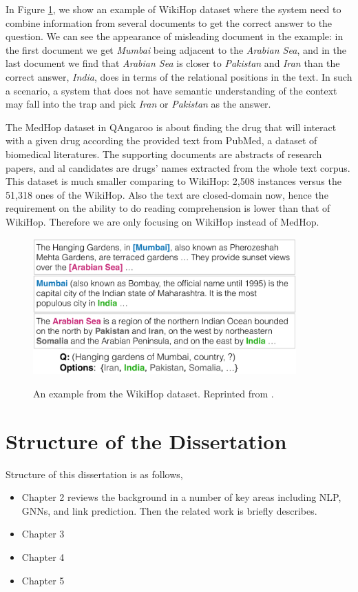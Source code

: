 \documentclass[12pt]{report}
\begin{document}
In Figure
\ref{wikihop_example}, we show an example of WikiHop dataset where the system need to combine information
from several documents to get the correct answer to the question. We can see the appearance of misleading
document in the example: in the first document we get \textit{Mumbai} being adjacent to the \textit{Arabian
Sea}, and in the last document we find that \textit{Arabian Sea} is closer to \textit{Pakistan} and \textit{Iran}
than the correct answer, \textit{India}, does in terms of the relational positions in the text. In such
a scenario, a system that does not have semantic understanding of the context may fall into the trap
and pick \textit{Iran} or \textit{Pakistan} as the answer.

The MedHop dataset in QAngaroo is about finding
the drug that will interact with a given drug according the provided text from PubMed, a dataset of biomedical
literatures. The supporting documents are abstracts of research papers, and al candidates are drugs'
names extracted from the whole text corpus. This dataset is much smaller comparing to WikiHop: 2,508
instances versus the 51,318 ones of the WikiHop. Also the text are closed-domain now, hence the requirement
on the ability to do reading comprehension is lower than that of WikiHop.
Therefore we are only focusing on WikiHop instead of MedHop.
\begin{figure}[H]
\centering
\includegraphics[width=0.9\textwidth]{figures/wikihop_example.png}
\label{wikihop_example}
\caption[An example from the WikiHop dataset]{An example from the WikiHop dataset. Reprinted from \cite{welbl_constructing_2018}.}
\end{figure}

\section{Structure of the Dissertation}
Structure of this dissertation is as follows,
\begin{itemize}
\item Chapter 2 reviews the background in a number of key areas including NLP, GNNs, and link prediction. Then the related work is briefly describes.
\item Chapter 3
\item Chapter 4
\item Chapter 5
\end{itemize}
\end{document}
